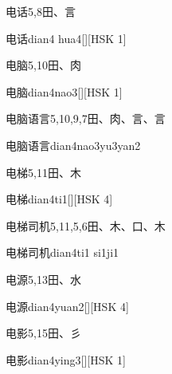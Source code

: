 \begin{Entry}{电话}{5,8}{⽥、⾔}
  \begin{Phonetics}{电话}{dian4 hua4}[][HSK 1]
  \end{Phonetics}
\end{Entry}

\begin{Entry}{电脑}{5,10}{⽥、⾁}
  \begin{Phonetics}{电脑}{dian4nao3}[][HSK 1]
  \end{Phonetics}
\end{Entry}

\begin{Entry}{电脑语言}{5,10,9,7}{⽥、⾁、⾔、⾔}
  \begin{Phonetics}{电脑语言}{dian4nao3yu3yan2}
  \end{Phonetics}
\end{Entry}

\begin{Entry}{电梯}{5,11}{⽥、⽊}
  \begin{Phonetics}{电梯}{dian4ti1}[][HSK 4]
  \end{Phonetics}
\end{Entry}

\begin{Entry}{电梯司机}{5,11,5,6}{⽥、⽊、⼝、⽊}
  \begin{Phonetics}{电梯司机}{dian4ti1 si1ji1}
  \end{Phonetics}
\end{Entry}

\begin{Entry}{电源}{5,13}{⽥、⽔}
  \begin{Phonetics}{电源}{dian4yuan2}[][HSK 4]
  \end{Phonetics}
\end{Entry}

\begin{Entry}{电影}{5,15}{⽥、⼺}
  \begin{Phonetics}{电影}{dian4ying3}[][HSK 1]
  \end{Phonetics}
\end{Entry}

